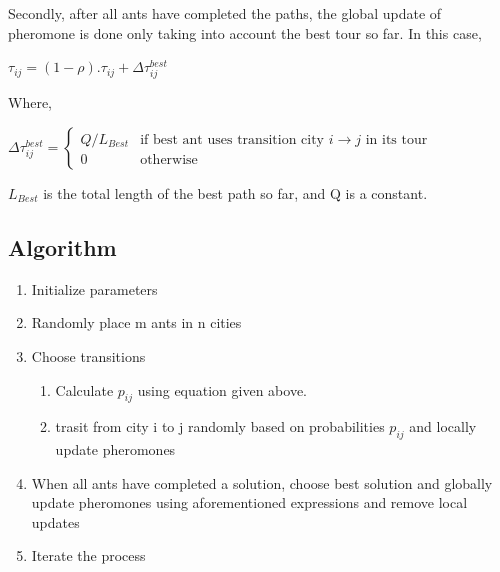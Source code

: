 \documentclass[11pt, english]{article}
\begin{document}
\noindent
Secondly, after all ants have completed the paths, the global update of pheromone is done only taking into account the best tour so far. In this case, 

\begin{center}
$\tau_{ij} = (1-\rho).\tau_{ij} + \Delta \tau_{ij}^{best}$
\end{center}
\noindent
Where,
\begin{center}
$\Delta \tau _{ij}^{best}={\begin{cases}Q/L_{Best}&{\mbox{if best ant}}{\mbox{ uses transition city }}i \rightarrow j{\mbox{ in its tour}}\\0&{\mbox{otherwise}}\end{cases}}$\\
\end{center}
\noindent
$L_{Best}$ is the total length of the best path so far, and Q is a constant.\\
 
\subsection{Algorithm}

\begin{enumerate}
	\item Initialize parameters
	\item Randomly place m ants in n cities
	\item Choose transitions
	\begin{enumerate}
		\item Calculate $p_{ij}$ using equation given above. 
		\item trasit from city {i} to {j} randomly based on probabilities $p_{ij}$ and locally update pheromones
	\end{enumerate}	 
	\item When all ants have completed a solution, choose best solution and globally update pheromones using aforementioned expressions and remove local updates
	\item Iterate the process
\end{enumerate}
\end{document}

